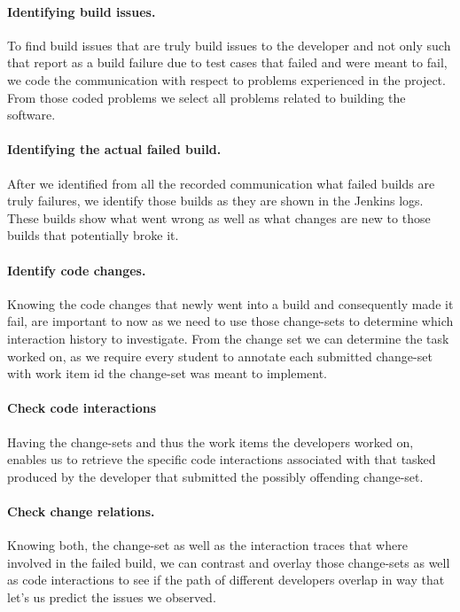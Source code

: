 \paragraph{Identifying build issues.}
To find build issues that are truly build issues to the developer and not only such that report as a build failure due to test cases that failed and were meant to fail, we code the communication with respect to problems experienced in the project.
From those coded problems we select all problems related to building the software.

\paragraph{Identifying the actual failed build.}
After we identified from all the recorded communication what failed builds are truly failures, we identify those builds as they are shown in the Jenkins logs.
These builds show what went wrong as well as what changes are new to those builds that potentially broke it.

\paragraph{Identify code changes.}
Knowing the code changes that newly went into a build and consequently made it fail, are important to now as we need to use those change-sets to determine which interaction history to investigate.
From the change set we can determine the task worked on, as we require every student to annotate each submitted change-set with work item id the change-set was meant to implement.

\paragraph{Check code interactions}
Having the change-sets and thus the work items the developers worked on, enables us to retrieve the specific code interactions associated with that tasked produced by the developer that submitted the possibly offending change-set.

\paragraph{Check change relations.}
Knowing both, the change-set as well as the interaction traces that where involved in the failed build, we can contrast and overlay those change-sets as well as code interactions to see if the path of different developers overlap in way that let's us predict the issues we observed.

